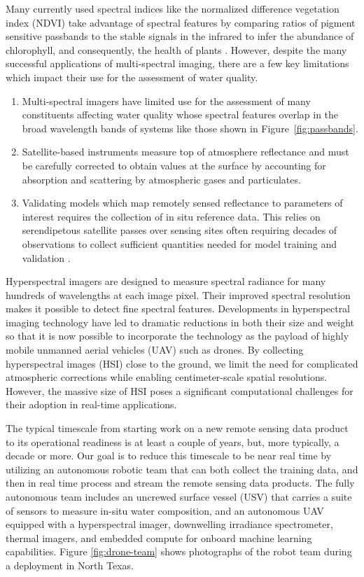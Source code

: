 Many currently used spectral indices like the normalized difference vegetation
index (NDVI) take advantage of spectral features by comparing ratios of
pigment sensitive passbands to the stable signals in the infrared to infer the
abundance of chlorophyll, and consequently, the health of plants
\cite{ndvi-chlorophyll}.  However, despite the many successful
applications of multi-spectral imaging, there are a few key limitations which
impact their use for the assessment of water quality.

\begin{enumerate}
  \item Multi-spectral imagers have limited use for the assessment of many
    constituents affecting water quality whose spectral features overlap in the
    broad wavelength bands of systems like those shown in Figure~\ref{fig:passbands}.
  \item Satellite-based instruments measure top of atmosphere reflectance and
    must be carefully corrected to obtain values at the surface by accounting for
    absorption and scattering by atmospheric gases and particulates.
  \item Validating models which map remotely sensed reflectance to parameters of
    interest requires the collection of in situ reference data. This relies on
    serendipetous satellite passes over sensing sites often requiring decades of
    observations to collect sufficient quantities needed for model training and
    validation \cite{aurin2018remote, ross2019aquasat}.
\end{enumerate}

Hyperspectral imagers are designed to measure spectral radiance for many
hundreds of wavelengths at each image pixel. Their improved spectral resolution
makes it possible to detect fine spectral features. Developments in
hyperspectral imaging technology have led to dramatic reductions in both their
size and weight so that it is now possible to incorporate the
technology as the payload of highly mobile unmanned aerial vehicles (UAV) such as
drones. By collecting hyperspectral images (HSI) close to the ground, we limit
the need for complicated atmospheric corrections while enabling centimeter-scale
spatial resolutions. However, the massive size of HSI poses a significant
computational challenges for their adoption in real-time
applications.

The typical timescale from starting work on a new remote sensing data
product to its operational readiness is at least a couple of years, but, more
typically, a decade or more. Our goal is to reduce this timescale to be near
real time by utilizing an autonomous robotic team that can both collect the
training data, and then in real time process and stream the remote sensing data
products. The fully autonomous team includes an uncrewed surface vessel (USV)
that carries a suite of sensors to measure in-situ water composition,
and an autonomous UAV equipped with a hyperspectral imager, downwelling
irradiance spectrometer, thermal imagers, and embedded compute for onboard machine
learning capabilities. Figure \ref{fig:drone-team} shows photographs of the robot team
during a deployment in North Texas.

